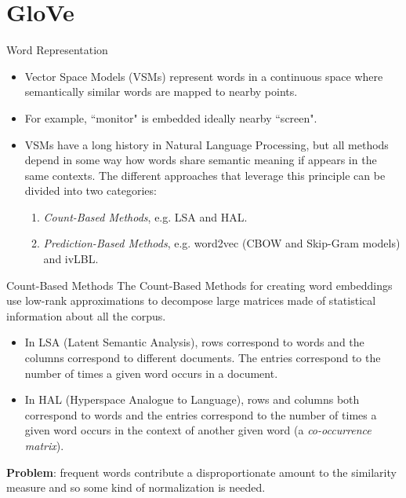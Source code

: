 \documentclass{beamer}
\begin{document}
\section{GloVe}
\begin{frame}{Word Representation}
	\begin{itemize}\setlength\itemsep{1em}
		\item Vector Space Models (VSMs) represent words in a continuous space where semantically similar words are mapped to nearby	points.
		\item For example, \textquotedblleft monitor" is embedded ideally nearby \textquotedblleft screen".
		\item VSMs have a long history in Natural Language Processing, but all methods depend in some way how words share semantic meaning if appears in the same contexts. The different approaches that leverage this principle can be divided into two categories:
		\begin{enumerate}
			\item \textit{Count-Based Methods}, e.g. LSA and HAL.
			\item \textit{Prediction-Based Methods}, e.g. word2vec (CBOW and Skip-Gram models) and ivLBL.
		\end{enumerate}
	\end{itemize}
\end{frame}
\begin{frame}{Count-Based Methods}
	The Count-Based Methods for creating word embeddings use low-rank approximations to decompose large matrices made of statistical information about all the corpus.
	\begin{itemize}\setlength\itemsep{1em}
		\item In LSA (Latent Semantic Analysis), rows correspond to words and the columns correspond to different documents. The entries correspond to the number of times a given word occurs in a document.
		\item In HAL (Hyperspace Analogue to Language), rows and columns both correspond to words and the	entries correspond to the number of times a given word occurs in the context of another given word (a \textit{co-occurrence matrix}).
	\end{itemize}
	\textbf{Problem}: frequent words contribute a disproportionate amount to the similarity measure and so some kind of normalization is needed.
\end{frame}
\end{document}
